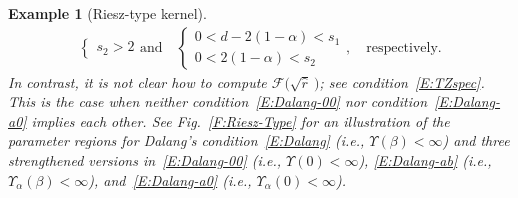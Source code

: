 \documentclass[sn-mathphys]{sn-jnl}%
\numberwithin{equation}{section}
\theoremstyle{thmstyleone}%
\theoremstyle{thmstyletwo}%
\newtheorem{example}{Example}[section]%
\theoremstyle{thmstylethree}%
\begin{document}
\begin{example}[Riesz-type kernel]
\begin{align}
\begin{cases}
      s_2 > 2
    \end{cases}
    \text{and} \quad
    \begin{cases}
      0 < d - 2(1-\alpha) < s_1 \\
      0 < 2(1-\alpha) < s_2
    \end{cases},
    \quad \text{respectively.}
	\end{align}
  In contrast, it is not clear how to compute $\mathcal{F}\big(\sqrt{\widehat{r}}\:\big)$; see
  condition~\eqref{E:TZspec}. This is the case when neither condition~\eqref{E:Dalang-00} nor
  condition~\eqref{E:Dalang-a0} implies each other. See Fig.~\ref{F:Riesz-Type} for an illustration
  of the parameter regions for Dalang's condition~\eqref{E:Dalang} (i.e., $\Upsilon(\beta)<\infty$)
  and three strengthened versions in~\eqref{E:Dalang-00} (i.e., $\Upsilon(0)<\infty$),
  \eqref{E:Dalang-ab} (i.e., $\Upsilon_\alpha(\beta)<\infty$), and~\eqref{E:Dalang-a0} (i.e.,
  $\Upsilon_\alpha(0)<\infty$).
\end{example}
\end{document}
